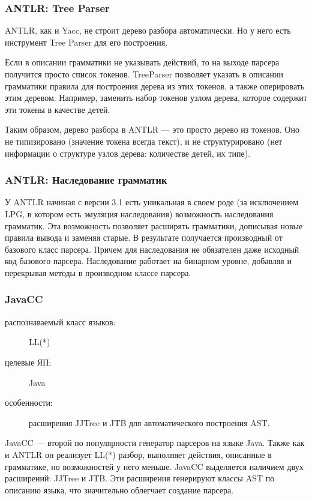 \documentclass[a4paper,12pt,titlepage]{extarticle}
\begin{document}
\subsubsection*{ANTLR: Tree Parser}
ANTLR, как и Yacc, не строит дерево разбора автоматически. Но у него есть
инструмент Tree Parser для его построения.

Если в описании грамматики не указывать действий, то на выходе парсера получится
просто список токенов. TreeParser позволяет указать в описании грамматики
правила для построения дерева из этих токенов, а также оперировать этим деревом.
Например, заменить набор токенов узлом дерева, которое содержит эти токены в
качестве детей.

Таким образом, дерево разбора в ANTLR --- это просто дерево из токенов. Оно не
типизировано (значение токена всегда текст), и не структурировано (нет
информации о структуре узлов дерева: количестве детей, их типе).

\subsubsection*{ANTLR: Наследование грамматик}
У ANTLR начиная с версии 3.1 есть уникальная в своем роде (за исключением
LPG, в котором есть эмуляция наследования) возможность наследования грамматик. Эта
возможность позволяет расширять грамматики, дописывая новые правила вывода и заменяя старые. В результате
получается производный от базового класс парсера. Причем для наследования не
обязателен даже исходный код базового парсера. Наследование работает на
бинарном уровне, добавляя и перекрывая методы в производном классе парсера.

\subsubsection*{JavaCC}
\begin{description}
  \item[распознаваемый класс языков:] LL(*)
  \item[целевые ЯП:] Java
  \item[особенности:] расширения JJTree и JTB для автоматического построения
  AST.
\end{description}
JavaCC --- второй по популярности генератор парсеров на языке Java. Также как и
ANTLR он реализует LL(*) разбор, выполняет действия, описанные в грамматике, но
возможностей у него меньше. JavaCC выделяется наличием двух расширений: JJTree и
JTB. Эти расширения генерируют классы AST по описанию языка, что значительно
облегчает создание парсера.
\end{document}
